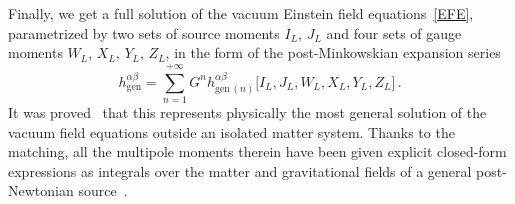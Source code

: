 \documentclass[prd,preprint,superscriptaddress,tightenlines,nofootinbib,
  eqsecnum,showpacs]{revtex4}
\begin{document}
Finally, we get a full solution of the vacuum Einstein field
equations~\eqref{EFE}, parametrized by two sets of source moments
$I_L$, $J_L$ and four sets of gauge moments $W_L$, $X_L$, $Y_L$,
$Z_L$, in the form of the post-Minkowskian expansion series
%
\begin{equation} \label{PMgen}
h_\text{gen}^{\alpha\beta} = \sum_{n=1}^{+\infty} G^n
h_{\mathrm{gen}\,(n)}^{\alpha\beta}\bigl[I_L,J_L,W_L,X_L,Y_L,Z_L\bigr]\,.
\end{equation}
%
It was proved~\cite{BD86} that this represents physically the most
general solution of the vacuum field equations outside an isolated
matter system.  Thanks to the matching, all the multipole moments
therein have been given explicit closed-form expressions as integrals
over the matter and gravitational fields of a general post-Newtonian
source~\cite{B98mult, PB02}.
\end{document}
